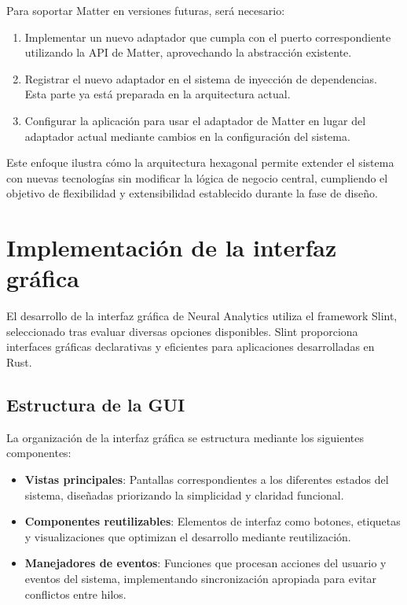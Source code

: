 Para soportar Matter en versiones futuras, será necesario:

\begin{enumerate}
    \item Implementar un nuevo adaptador que cumpla con el puerto correspondiente utilizando la API de Matter, aprovechando la abstracción existente.
    \item Registrar el nuevo adaptador en el sistema de inyección de dependencias. Esta parte ya está preparada en la arquitectura actual.
    \item Configurar la aplicación para usar el adaptador de Matter en lugar del adaptador actual mediante cambios en la configuración del sistema.
\end{enumerate}

Este enfoque ilustra cómo la arquitectura hexagonal permite extender el sistema con nuevas tecnologías sin modificar la lógica de negocio central, cumpliendo el objetivo de flexibilidad y extensibilidad establecido durante la fase de diseño.

\section{Implementación de la interfaz gráfica}

El desarrollo de la interfaz gráfica de Neural Analytics utiliza el framework Slint, seleccionado tras evaluar diversas opciones disponibles. Slint proporciona interfaces gráficas declarativas y eficientes para aplicaciones desarrolladas en Rust.

\subsection{Estructura de la GUI}

La organización de la interfaz gráfica se estructura mediante los siguientes componentes:

\begin{itemize}
    \item \textbf{Vistas principales}: Pantallas correspondientes a los diferentes estados del sistema, diseñadas priorizando la simplicidad y claridad funcional.
    \item \textbf{Componentes reutilizables}: Elementos de interfaz como botones, etiquetas y visualizaciones que optimizan el desarrollo mediante reutilización.
    \item \textbf{Manejadores de eventos}: Funciones que procesan acciones del usuario y eventos del sistema, implementando sincronización apropiada para evitar conflictos entre hilos.
\end{itemize}

